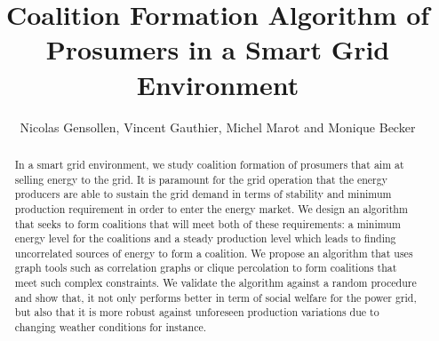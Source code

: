\documentclass[conference]{IEEEtran}
\begin{document}
%
%
\title{Coalition Formation Algorithm of Prosumers in a Smart Grid Environment}

%
%
\author{Nicolas Gensollen, Vincent Gauthier, Michel Marot and Monique Becker \\
}

\maketitle

%
%
\begin{abstract}
In a smart grid environment, we study coalition formation of prosumers that aim at selling energy to the grid. It is paramount for the grid operation that the energy producers are able to sustain the grid demand in terms of stability and minimum production requirement in order to enter the energy market. We design an algorithm that seeks to form coalitions that will meet both of these requirements:  a minimum energy level for the coalitions and a steady production level which leads to finding uncorrelated sources of energy  to form a coalition. We propose an algorithm that uses graph tools such as correlation graphs or clique percolation to form coalitions that meet such complex constraints. We validate the algorithm against a random procedure and show that, it not only performs better in term of social welfare for the power grid, but also that it is more robust against unforeseen production variations due to changing weather conditions for instance. 
\end{abstract}

\IEEEpeerreviewmaketitle


%
%
\end{document}
